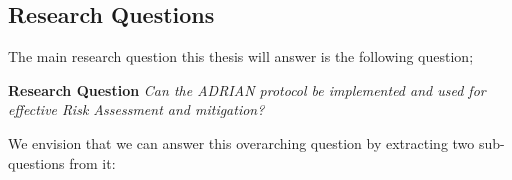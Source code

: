\subsection{Research Questions}
\label{ssec:research-questions}

The main research question this thesis will answer is the following question;

\vspace{0.5em}
\textbf{Research Question}\label{rq} \emph{Can the ADRIAN protocol be implemented and used for effective Risk Assessment and mitigation?}\vspace{1em}

We envision that we can answer this overarching question by extracting two sub-questions from it:


